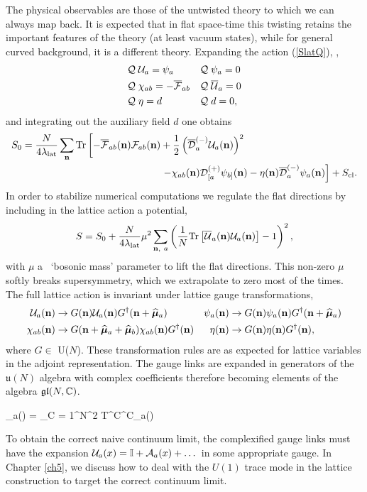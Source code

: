 The physical observables are those of the untwisted theory to which we can always map back.
It is expected that in flat space-time this twisting retains the important features 
of the theory (at least vacuum states), 
while for general curved background, it is a different theory. 
Expanding the action (\ref{SlatQ}), ,
\begin{align}
  & \mathcal Q\; \mathcal U_a = \psi_a          & & \mathcal Q\; \psi_a = 0 \nonumber \\
  & \mathcal Q\; \chi_{ab} = -{\overline{\cal F}}_{ab}  & & \mathcal Q\; {\overline{\cal U}}_a = 0 \label{BRSTlatticesymmetry} \\
  & \mathcal Q\; \eta = d                & & \mathcal Q\; d = 0, \nonumber
\end{align}
and integrating out the auxiliary field $d$ one obtains
\begin{equation}
  \label{eq:lat_act}
  \begin{split}
    S_0 & = \frac{N}{4\lambda_{\rm lat}} \sum_{\mathbf{n}} \mbox{Tr}\left[-{\overline{\cal F}}_{ab}(\mathbf{n}) {\cal F}_{ab}(\mathbf{n}) + \frac{1}{2}\left({\overline{\cal D}}_a^{(-)}\mathcal U_a(\mathbf{n})\right)^2 \right. \\
        & \qquad\qquad\qquad\qquad\qquad\qquad\qquad \left. - \chi_{ab}(\mathbf{n}) \mathcal D^{(+)}_{[a}\psi_{b]}(\mathbf{n}) - \eta(\mathbf{n}) {\overline{\cal D}}^{(-)}_a\psi_a(\mathbf{n})\right] + S_{\rm cl}.
  \end{split}
\end{equation}
In order to stabilize numerical computations we regulate the flat directions by
 including in the lattice action a potential, 
\begin{equation}
  \label{eq:mass}
  S = S_0 + \frac{N}{4\lambda_{\rm lat}} \mu^2 \sum_{\mathbf{n},\ a} \left(\frac{1}{N}\mbox{Tr}\left[{\overline{\cal U}}_a(\mathbf{n}) \mathcal U_a(\mathbf{n})\right] - 1\right)^2,
\end{equation}
with $\mu$ a ~`bosonic mass' parameter to lift the flat directions. 
This non-zero $\mu$ softly breaks supersymmetry, which we 
extrapolate to zero most of the times. 
The full lattice action is invariant under lattice gauge transformations,
\begin{align}
  \mathcal U_a(\mathbf{n}) & \to G(\mathbf{n})\mathcal U_a(\mathbf{n})G^{\dag}(\mathbf{n}+\widehat{\boldsymbol{\mu}}_a)                   &
  \psi_a(\mathbf{n}) & \to G(\mathbf{n})\psi_a(\mathbf{n})G^{\dag}(\mathbf{n}+\widehat{\boldsymbol{\mu}}_a)                 \\
  \chi_{ab}(\mathbf{n}) & \to G(\mathbf{n}+\widehat{\boldsymbol{\mu}}_a+\widehat{\boldsymbol{\mu}}_b)\chi_{ab}(\mathbf{n})G^{\dag}(\mathbf{n}) &
  \eta(\mathbf{n}) & \to G(\mathbf{n})\eta(\mathbf{n})G^{\dag}(\mathbf{n}),                              \nonumber
\end{align}
where $G \in$ U($N$).
These transformation rules are as expected for lattice variables in the adjoint representation.
The gauge links are expanded in generators of the $\mathfrak u(N)$ algebra with complex coefficients
therefore becoming elements of the algebra $\mathfrak{gl}(N, \mathbb C)$.

\beq
  \cU_a(\vn) = \sum_{C = 1}^{N^2} T^C\cU^C_a(\vn)
\eeq

To obtain the correct naive continuum limit, the complexified gauge links must have the 
expansion $\mathcal U_a(x) = \mathbb I + \mathcal A_a(x) + \dots$ in some appropriate gauge. 
In Chapter \ref{ch5}, we discuss how to deal with the $U(1)$ trace mode in the 
lattice construction to target the correct continuum limit. 